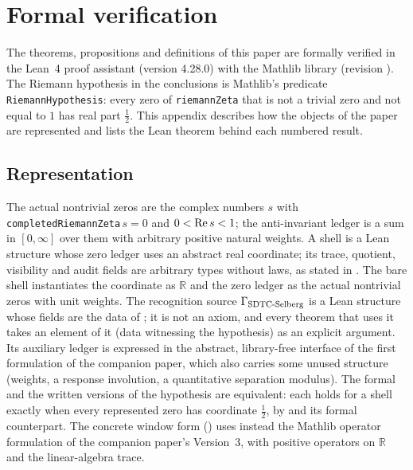 \section{Formal verification}
\label{app:formalization}

The theorems, propositions and definitions of this paper are formally
verified in the Lean~4 proof assistant (version 4.28.0) with the Mathlib library (revision
).  The Riemann
hypothesis in the conclusions is Mathlib's predicate
\texttt{RiemannHypothesis}: every zero of \texttt{riemannZeta} that is
not a trivial zero and not equal to \(1\) has real part \(\frac12\).
This appendix describes how the objects of the paper are represented
and lists the Lean theorem behind each numbered result.

\subsection*{Representation}

The actual nontrivial zeros are the complex numbers \(s\) with
\texttt{completedRiemannZeta}\,\(s=0\) and \(0<\operatorname{Re} s<1\); the
anti-invariant ledger is a sum in \([0,\infty]\) over them with arbitrary
positive natural weights.  A shell is a Lean structure whose zero ledger
uses an abstract real coordinate; its trace, quotient, visibility and
audit fields are arbitrary types without laws, as stated in
.  The bare shell instantiates the coordinate as
\(\mathbb R\) and the zero ledger as the actual nontrivial zeros with
unit weights.  The recognition source \(\Gamma_{\mathrm{SDTC\text{-}Selberg}}\) is a Lean
structure whose fields are the data of
; it is not an axiom, and every theorem
that uses it takes an element of it (data witnessing the hypothesis)
as an explicit argument.  Its
auxiliary ledger is expressed in the abstract, library-free interface
of the first formulation of the companion paper, which also carries some unused structure (weights, a response involution, a
quantitative separation modulus).  The formal and the written versions
of the hypothesis are equivalent: each holds for a shell exactly when
every represented zero has coordinate \(\frac12\), by
 and its formal counterpart.  The concrete window form
() uses instead the Mathlib operator
formulation of the companion paper's Version~3, with positive operators
on \(\mathbb R\) and the linear-algebra trace.

